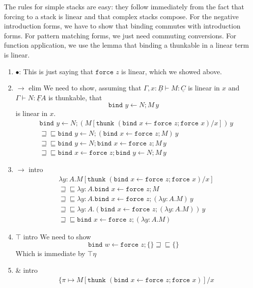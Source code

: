 \documentclass[acmsmall,nonacm]{acmart}
\renewcommand{\u}{\underline}
\newcommand{\ltdyn}{\sqsubseteq}
\newcommand{\gtdyn}{\sqsupseteq}
\newcommand{\equidyn}{\mathrel{\gtdyn\ltdyn}}
\newcommand{\pairone}[1]{\{ \pi \mapsto {#1}}
\newcommand{\bindXtoYinZ}[2]{\kw{bind}#2 \leftarrow #1;}
\newcommand{\kw}[1]{\texttt{#1}\,\,}
\newcommand{\thunk}{\kw{thunk}}
\newcommand{\force}{\kw{force}}
\newcommand{\with}{\mathbin{\&}}
\begin{document}
{\begin{longonly}
\begin{longproof}
  The rules for simple stacks are easy: they follow immediately from
  the fact that forcing to a stack is linear and that complex stacks
  compose.  For the negative introduction forms, we have to show that
  binding commutes with introduction forms. For pattern matching
  forms, we just need commuting conversions. For function application,
  we use the lemma that binding a thunkable in a linear term is
  linear.
  \begin{enumerate}
  \item $\bullet$: This is just saying that $\force z$ is linear,
    which we showed above.
  \item $\to$ elim We need to show, assuming that $\Gamma, x : \u B
    \vdash M : \u C$ is linear in $x$ and $\Gamma \vdash N : \u F A$
    is thunkable, that
    \[
    \bindXtoYinZ N y M\,y
    \]
    is linear in $x$.
    \begin{align*}
      &\bindXtoYinZ N y (M[\thunk{(\bindXtoYinZ {\force z} x \force x)}/x])\,y\\
      &\equidyn \bindXtoYinZ N y (\bindXtoYinZ {\force z} x M)\,y \tag{$M$ linear in $x$}\\
      &\equidyn \bindXtoYinZ N y \bindXtoYinZ {\force z} x M\,y \tag{$\u F\eta$}\\
      &\equidyn \bindXtoYinZ {\force z} x \bindXtoYinZ N y M\,y\tag{thunkables are central}
    \end{align*}
  \item $\to$ intro
    \begin{align*}
      & \lambda y:A. M[\thunk{(\bindXtoYinZ {\force z} x \force x)}/x]\\
      &\equidyn \lambda y:A. \bindXtoYinZ {\force z} x M \tag{$M$ is linear}\\
      &\equidyn \lambda y:A. \bindXtoYinZ {\force z} x (\lambda y:A. M)\, y \tag{$\to\beta$}\\
      &\equidyn \lambda y:A. (\bindXtoYinZ {\force z} x (\lambda y:A. M))\, y \tag{$\u F\eta$}\\
      &\equidyn \bindXtoYinZ {\force z} x (\lambda y:A. M) \tag{$\to\eta$}
    \end{align*}
  \item $\top$ intro
    We need to show
    \[ \bindXtoYinZ {\force z} w \{\} \equidyn \{\} \]
    Which is immediate by $\top\eta$
  \item $\with$ intro
    \begin{align*}
      &     \pairone{M[\thunk {(\bindXtoYinZ {\force z} x \force x)}]/x}\\

\end{align*}
\end{enumerate}
\end{longproof}
\end{longonly}}
\end{document}

